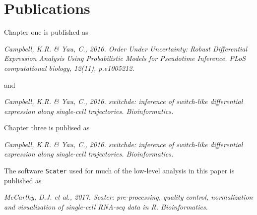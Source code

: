 \chapter*{Publications}



Chapter one is published as 
\begin{displayquote}
\emph{Campbell, K.R. \& Yau, C., 2016. Order Under Uncertainty: Robust Differential Expression Analysis Using Probabilistic Models for Pseudotime Inference. PLoS computational biology, 12(11), p.e1005212.}
\end{displayquote}
and
\begin{displayquote}
\emph{Campbell, K.R. \& Yau, C., 2016. switchde: inference of switch-like differential expression along single-cell trajectories. Bioinformatics.
}
\end{displayquote}
Chapter three is publised as
\begin{displayquote}
\emph{Campbell, K.R. \& Yau, C., 2016. switchde: inference of switch-like differential expression along single-cell trajectories. Bioinformatics.
}
\end{displayquote}
The software \texttt{Scater} used for much of the low-level analysis in this paper is published as
\begin{displayquote}
\emph{McCarthy, D.J. et al., 2017. Scater: pre-processing, quality control, normalization and visualization of single-cell RNA-seq data in R. Bioinformatics.}
\end{displayquote}

